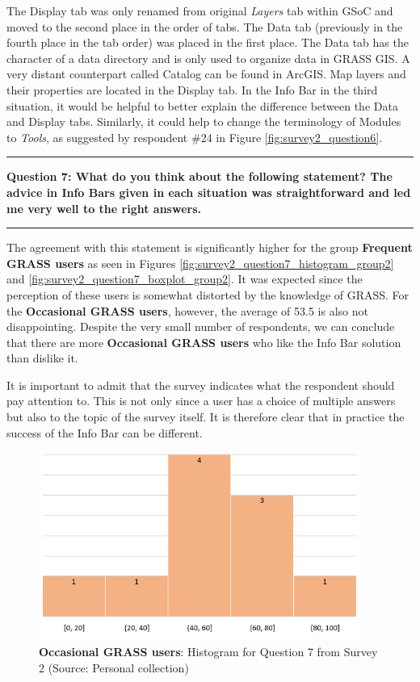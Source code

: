 \documentclass[a4paper,10pt,twoside]{article}
\begin{document}
\newpage
\noindent The Display tab was only renamed from original \textit{Layers} tab within GSoC and moved to the second place in the order of tabs. The Data tab (previously in the fourth place in the tab order) was placed in the first place. The Data tab has the character of a data directory and is only used to organize data in GRASS GIS. A very distant counterpart called Catalog can be found in ArcGIS. Map layers and their properties are located in the Display tab. In the Info Bar in the third situation, it would be helpful to better explain the difference between the Data and Display tabs. Similarly, it could help to change the terminology of Modules to \textit{Tools}, as suggested by respondent \#24 in Figure \ref{fig:survey2_question6}.

\par\noindent\rule{\textwidth}{0.4pt}
\noindent \textbf{Question 7: What do you think about the following statement? The advice in Info Bars given in each situation was straightforward and led me very well to the right answers.}
\par\noindent\rule{\textwidth}{0.4pt}

\noindent The agreement with this statement is significantly higher for the group \textbf{Frequent GRASS users} as seen in Figures \ref{fig:survey2_question7_histogram_group2} and \ref{fig:survey2_question7_boxplot_group2}. It was expected since the perception of these users is somewhat distorted by the knowledge of GRASS. For the \textbf{Occasional GRASS users}, however, the average of 53.5 is also not disappointing. Despite the very small number of respondents, we can conclude that there are more \textbf{Occasional GRASS users} who like the Info Bar solution than dislike it.

It is important to admit that the survey indicates what the respondent should pay attention to. This is not only since a user has a choice of multiple answers but also to the topic of the survey itself. It is therefore clear that in practice the success of the Info Bar can be different.

\vspace{0.3cm}
\begin{figure}[hbt!] 
\begin{center}
\includegraphics[width=10.5cm]{../surveys/analyzed_data/survey2_question7_histogram_group1.png} 
\caption[\textbf{Occasional GRASS users}: Histogram for Question 7 from Survey 2]{\textbf{Occasional GRASS users}: Histogram for Question 7 from Survey 2 (Source: Personal collection)}
\label{fig:survey2_question7_histogram_group1}
\end{center}
\end{figure}
\end{document}

